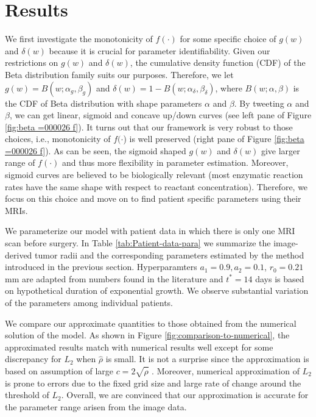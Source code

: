 \documentclass{aims}
\numberwithin{equation}{section}
\begin{document}
\section{Results}

We first investigate the monotonicity of $f(\cdot)$ for some specific
choice of $g(w)$ and $\delta(w)$ because it is crucial for parameter
identifiability. Given our restrictions on $g(w)$ and $\delta(w)$,
the cumulative density function (CDF) of the Beta distribution family
suits our purposes.  Therefore, we let $g(w)=B(w;\alpha_g,\beta_g)$ and $\delta(w)=1-B(w;\alpha_{\delta},\beta_{\delta})$, where $B(w; \alpha, \beta)$ is the CDF of Beta distribution with shape parameters $\alpha$ and $\beta$. By tweeting $\alpha$ and $\beta$, we can get linear, sigmoid and concave
up/down curves (see left pane of Figure \ref{fig:beta =000026 f}).
It turns out that our framework is very robust to those choices, i.e.,
monotonicity of $f(\cdot$) is well preserved (right pane of Figure
\ref{fig:beta =000026 f}). As can be seen, the sigmoid shaped $g(w)$
and $\delta(w)$ give larger range of $f(\cdot)$ and thus more flexibility
in parameter estimation. Moreover, sigmoid curves are believed to
be biologically relevant (most enzymatic reaction rates have the same
shape with respect to reactant concentration). Therefore, we focus
on this choice and move on to find patient specific parameters using
their MRIs.


We parameterize our model with patient data in which there is only
one MRI scan before surgery. In Table \ref{tab:Patient-data-para}
we summarize the image-derived tumor radii and the corresponding parameters
estimated by the method introduced in the previous section. Hyperparamters $a_1=0.9, a_2=0.1$, $r_0=0.21$ mm are  adapted from numbers found in the literature \cite{Swanson2008, Stepien2015a} and $t^*=14$ days is based on hypothetical duration of exponential growth. We observe
substantial variation of the parameters among individual patients. 

We compare our approximate quantities to those obtained from the numerical
solution of the model. As shown in Figure \ref{fig:comparison-to-numerical},
the approximated results match with numerical results well except
for some discrepancy for $L_{2}$ when $\hat{\rho}$ is small. It
is not a surprise since the approximation is based on assumption of
large $c=2\sqrt{\hat{\rho}}$ . Moreover, numerical approximation
of $L_{2}$ is prone to errors due to the fixed grid size and large
rate of change around the threshold of $L_{2}$. Overall, we are convinced
that our approximation is accurate for the parameter range arisen
from the image data.
\end{document}
